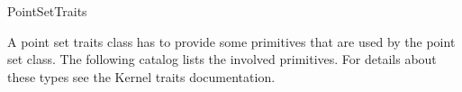 \begin{ccRefConcept} {PointSetTraits}


A point set traits class has to provide some primitives that are used by the point set class.
The following catalog lists the involved primitives.
For details about these types see the Kernel traits documentation.

\ccTypes

%
{ }

%
{ }

%
{ }

%
{ }

%
{ }	
	
%
{ }

%
{ }

%
{ }	
	
%
{ }

%
{ }

%
{ }

\end{ccRefConcept}

